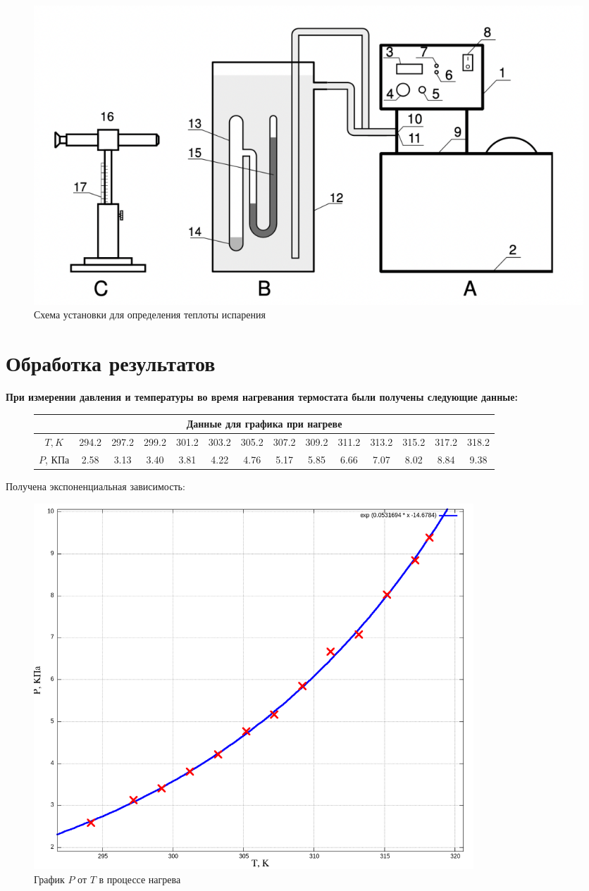 \documentclass[a4paper,10pt]{article} %
\begin{document}
\begin{figure}[H]
	\centering
	\includegraphics[scale=0.8]{Picture1}
	\caption{Схема установки для определения теплоты испарения}
\end{figure}

	
\section {Обработка результатов}
\textbf{При измерении давления и температуры во время нагревания термостата были получены следующие данные:}

\begin{figure}[H]
\begin{tabular}{|c|c|c|c|c|c|c|c|c|c|c|c|c|c|}
\hline
\multicolumn{14}{|c|}{Данные для графика при нагреве}\\
\hline
$T, K$&294.2&297.2&299.2&301.2&303.2&305.2&307.2&309.2&311.2&313.2&315.2&317.2&318.2\\\hline
$P$, КПа&2.58&3.13&3.40&3.81&4.22&4.76&5.17&5.85&6.66&7.07&8.02&8.84&9.38\\\hline
\end{tabular}
\end{figure}

Получена экспоненциальная зависимость:


\begin{figure}[H]
	\centering
	\includegraphics[width=0.8\textwidth]{2-4-1-1-res.png}
	\caption{График $P$ от $T$ в процессе нагрева}
\end{figure}
\end{document}
